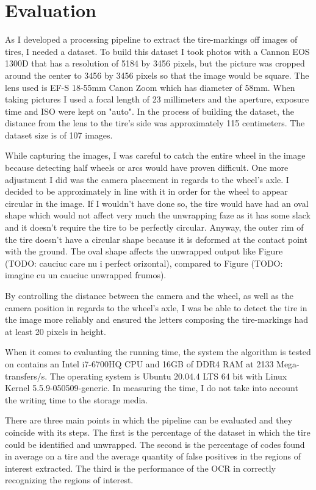 \chapter{Evaluation}\pagestyle{fancy}\setlength{\parindent}{3em}
\label{chapter:evaluation}

As I developed a processing pipeline to extract the tire-markings off images of tires, I needed a dataset. To build this dataset I took photos with a Cannon EOS 1300D that has a resolution of 5184 by 3456 pixels, but the picture was cropped around the center to 3456 by 3456 pixels so that the image would be square. The lens used is EF-S 18-55mm Canon Zoom which has diameter of 58mm. When taking pictures I used a focal length of 23 millimeters and the aperture, exposure time and ISO were kept on "auto". In the process of building the dataset, the distance from the lens to the tire's side was approximately 115 centimeters. The dataset size is of 107 images.

While capturing the images, I was careful to catch the entire wheel in the image because detecting half wheels or arcs would have proven difficult. One more adjustment I did was the camera placement in regards to the wheel's axle. I decided to be approximately in line with it in order for the wheel to appear circular in the image. If I wouldn't have done so, the tire would have had an oval shape which would not affect very much the unwrapping faze as it has some slack and it doesn't require the tire to be perfectly circular. Anyway, the outer rim of the tire doesn't have a circular shape because it is deformed at the contact point with the ground. The oval shape affects the unwrapped output like Figure (TODO: cauciuc care nu i perfect orizontal), compared to Figure (TODO: imagine cu un cauciuc unwrapped frumos).

By controlling the distance between the camera and the wheel, as  well as the camera position in regards to the wheel's axle, I was be able to detect the tire in the image more reliably and ensured the letters composing the tire-markings had at least 20 pixels in height.

When it comes to evaluating the running time, the system the algorithm is tested on contains an Intel i7-6700HQ CPU and 16GB of DDR4 RAM at 2133 Mega-transfers/s. The operating system is Ubuntu 20.04.4 LTS 64 bit with Linux Kernel 5.5.9-050509-generic. In measuring the time, I do not take into account the writing time to the storage media.

There are three main points in which the pipeline can be evaluated and they coincide with its steps. The first is the percentage of the dataset in which the tire could be identified and unwrapped. The second is the percentage of codes found in average on a tire and the average quantity of false positives in the regions of interest extracted. The third is the performance of the OCR in correctly recognizing the regions of interest.

